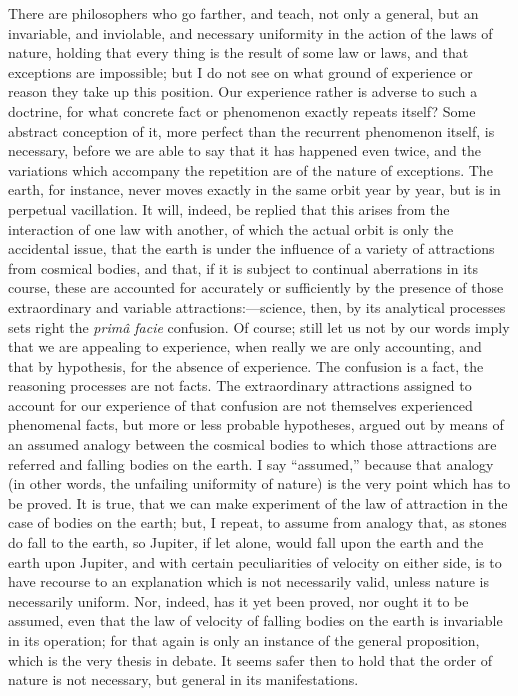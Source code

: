 There are philosophers who go farther, and teach, not only a
general, but an invariable, and inviolable, and necessary uniformity
in the action of the laws of nature, holding that every thing is the
result of some law or laws, and that exceptions are impossible; but I
do not see on what ground of experience or reason they take up this
position. Our experience rather is adverse to such a doctrine, for
what concrete fact or phenomenon exactly repeats itself? Some abstract
conception of it, more perfect than the recurrent phenomenon itself,
is necessary, before we are able to say that it has happened even
twice, and the variations which accompany the repetition are of the
nature of exceptions. The earth, for instance, never moves exactly in
the same orbit year by year, but is in perpetual vacillation. It will,
indeed, be replied that this arises from the interaction of one law
with another, of which the actual orbit is only the accidental issue,
that the earth is under the influence of a variety of attractions from
cosmical bodies, and that, if it is subject to continual aberrations
in its course, these are accounted for accurately or sufficiently by
the presence of those extraordinary and variable attractions:—science,
then, by its analytical processes sets right the \emph{primâ facie}
confusion. Of course; still let us not by our words imply that we are
appealing to experience, when really we are only accounting, and that
by hypothesis, for the absence of experience. The confusion is a fact,
the reasoning processes are not facts. The extraordinary
attractions assigned to account for our experience of that confusion
are not themselves experienced phenomenal facts, but more or less
probable hypotheses, argued out by means of an assumed analogy between
the cosmical bodies to which those attractions are referred and
falling bodies on the earth. I say ``assumed,'' because that
analogy (in other words, the unfailing uniformity of nature) is the
very point which has to be proved. It is true, that we can make
experiment of the law of attraction in the case of bodies on the
earth; but, I repeat, to assume from analogy that, as stones do fall
to the earth, so Jupiter, if let alone, would fall upon the earth and
the earth upon Jupiter, and with certain peculiarities of velocity on
either side, is to have recourse to an explanation which is not
necessarily valid, unless nature is necessarily uniform. Nor, indeed,
has it yet been proved, nor ought it to be assumed, even that the law
of velocity of falling bodies on the earth is invariable in its
operation; for that again is only an instance of the general
proposition, which is the very thesis in debate. It seems safer then
to hold that the order of nature is not necessary, but general in its
manifestations.

